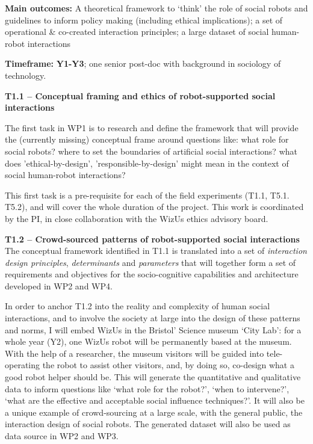 \documentclass[11pt,a4paper]{report}
\newcommand{\project}{WizUs\xspace}
\begin{document}
\begin{framed}
    \textbf{Main outcomes:} A theoretical framework to `think' the role of
    social robots and guidelines to inform policy making (including ethical
    implications); a set of operational \& co-created interaction principles; a
    large dataset of social human-robot interactions

    \textbf{Timeframe:} \textbf{Y1-Y3}; one senior post-doc
with background in sociology of technology.
\end{framed}


\textbf{T1.1 -- Conceptual framing and ethics of robot-supported social
interactions}


The first task in WP1 is to research and define the framework that will provide
the (currently missing) conceptual frame around questions like: what role for
social robots? where to set the boundaries of artificial social interactions?
what does 'ethical-by-design', 'responsible-by-design' might mean in the context
of social human-robot interactions? 


This first task is a pre-requisite for each of the field experiments (T1.1,
T5.1. T5.2), and will cover the whole duration of the project. This work is
coordinated by the PI, in close collaboration with the \project ethics advisory
board.


\textbf{T1.2 -- Crowd-sourced patterns of robot-supported social
interactions} The conceptual framework identified in T1.1 is translated
into a set of \emph{interaction design principles}, \emph{determinants} and
\emph{parameters} that will together form a set of requirements and objectives
for the socio-cognitive capabilities and architecture developed in WP2 and WP4.

In order to anchor T1.2 into the reality and complexity of human social
interactions, and to involve the society at large into the design of these
patterns and norms, I will embed \project in the Bristol' Science museum `City
Lab': for a whole year (Y2), one \project robot will be permanently based at the
museum. With the help of a researcher, the museum visitors will be guided into
tele-operating the robot to assist other visitors, and, by doing so, co-design
what a good robot helper should be. This will generate the quantitative and
qualitative data to inform questions like `what role for the robot?', `when to
intervene?', `what are the effective and acceptable social influence
techniques?'. It will also be a unique example of crowd-sourcing at a large
scale, with the general public, the interaction design of social robots.  The
generated dataset will also be used as data source in WP2 and WP3.
\end{document}
